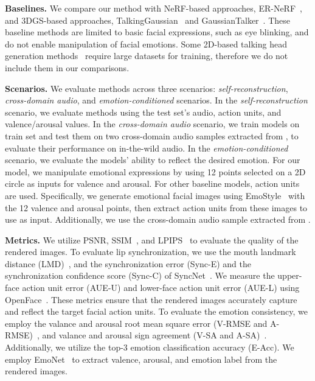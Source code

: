 \noindent\textbf{Baselines.} We compare our method with NeRF-based approaches, ER-NeRF~\cite{li2023efficient}, and 3DGS-based approaches, TalkingGaussian~\cite{li2024talkinggaussian} and GaussianTalker~\cite{cho2024gaussiantalker}. These baseline methods are limited to basic facial expressions, such as eye blinking, and do not enable manipulation of facial emotions. Some 2D-based talking head generation methods~\cite{gan2023efficient,wang2023progressive} require large datasets for training, therefore we do not include them in our comparisons.

\noindent\textbf{Scenarios.} We evaluate methods across three scenarios: \emph{self-reconstruction}, \emph{cross-domain audio}, and \emph{emotion-conditioned} scenarios. In the \emph{self-reconstruction} scenario, we evaluate methods using the test set's audio, action units, and valence/arousal values. In the \emph{cross-domain audio} scenario, we train models on train set and test them on two cross-domain audio samples extracted from \cite{suwajanakorn2017synthesizing}, to evaluate their performance on in-the-wild audio. In the \emph{emotion-conditioned} scenario, we evaluate the models' ability to reflect the desired emotion. For our model, we manipulate emotional expressions by using 12 points selected on a 2D circle as inputs for valence and arousal. For other baseline models, action units are used. Specifically, we generate emotional facial images using EmoStyle~\cite{azari2024emostyle} with the 12 valence and arousal points, then extract action units from these images to use as input. Additionally, we use the cross-domain audio sample extracted from \cite{suwajanakorn2017synthesizing}.

\noindent\textbf{Metrics.}
We utilize PSNR, SSIM~\cite{wang2004image}, and LPIPS~\cite{zhang2018unreasonable} to evaluate the quality of the rendered images. To evaluate lip synchronization, we use the mouth landmark distance (LMD)~\cite{chen2018lip}, and the synchronization error (Sync-E) and the synchronization confidence score (Sync-C) of SyncNet~\cite{chung2017out}. We measure the upper-face action unit error (AUE-U) and lower-face action unit error (AUE-L) using OpenFace~\cite{baltruvsaitis2015cross,Baltrusaitis2018openface}. These metrics ensure that the rendered images accurately capture and reflect the target facial action units. To evaluate the emotion consistency, we employ the valance and arousal root mean square error (V-RMSE and A-RMSE)~\cite{toisoul2021estimation}, and valance and arousal sign agreement (V-SA and A-SA)~\cite{toisoul2021estimation}. Additionally, we utilize the top-3 emotion classification accuracy (E-Acc). We employ EmoNet~\cite{toisoul2021estimation} to extract valence, arousal, and emotion label from the rendered images.

